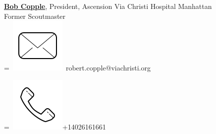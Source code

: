 \documentclass[]{latex/resume}
\begin{document}
\begin{minipage}[t]{0.25\textwidth}
{    \sectionsep
    
    \href{https://www.linkedin.com/in/bob-copple-8804a713/}{\textbf{Bob Copple}}, President, Ascension Via Christi Hospital Manhattan\\Former Scoutmaster\\
    \begingroup
        =\hbox{
            \includegraphics[scale=0.1,trim={0 1cm 0cm 0cm}]{latex/icons/mail.png}\hspace{0.3cm} robert.copple@viachristi.org
        }
        \parbox{\wd0}{}
    \endgroup
    \begingroup
        =\hbox{
            \includegraphics[scale=0.1,trim={0 1.25cm -0.4cm 0cm}]{latex/icons/phone.png}\hspace{0.3cm}+14026161661
        }
        \parbox{\wd0}{}
    \endgroup \\






\end{minipage} 
\end{document}

